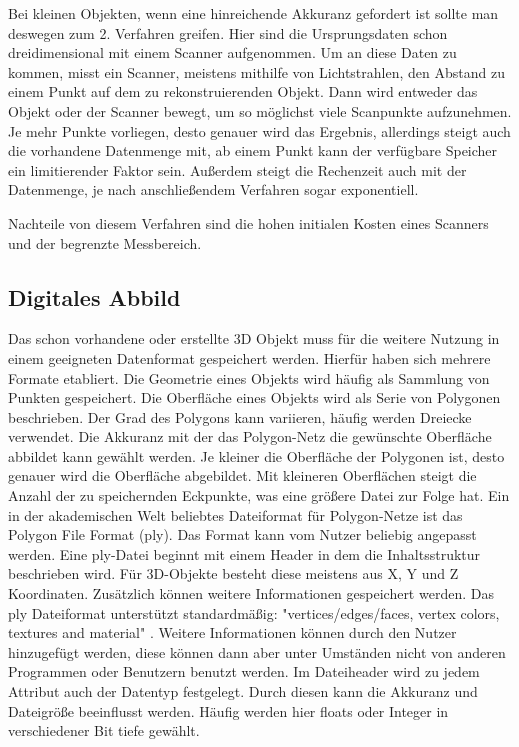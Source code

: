 \documentclass[../main.tex]{subfiles}
\begin{document}
Bei kleinen Objekten, wenn eine hinreichende Akkuranz gefordert ist sollte man 
deswegen zum 2. Verfahren greifen. Hier sind die Ursprungsdaten schon 
dreidimensional mit einem Scanner aufgenommen. Um an diese Daten zu kommen, 
misst ein Scanner, meistens mithilfe von Lichtstrahlen, den Abstand zu einem 
Punkt auf dem zu rekonstruierenden Objekt. Dann wird entweder das Objekt oder 
der Scanner bewegt, um so möglichst viele Scanpunkte aufzunehmen.
Je mehr Punkte vorliegen, desto genauer wird das Ergebnis, allerdings steigt
auch die vorhandene Datenmenge mit, ab einem Punkt kann der verfügbare 
Speicher ein limitierender Faktor sein. Außerdem steigt die Rechenzeit auch mit
der Datenmenge, je nach anschließendem Verfahren sogar exponentiell.

Nachteile von diesem Verfahren sind die hohen initialen Kosten eines Scanners 
und der begrenzte Messbereich. 

\subsection{Digitales Abbild}

Das schon vorhandene oder erstellte 3D Objekt muss für die weitere Nutzung
in einem geeigneten Datenformat gespeichert werden. Hierfür haben sich mehrere
Formate etabliert. Die Geometrie eines Objekts wird häufig als Sammlung von Punkten 
gespeichert. Die Oberfläche eines Objekts wird als Serie von Polygonen beschrieben. 
Der Grad des Polygons kann variieren, häufig werden Dreiecke verwendet. Die Akkuranz
mit der das Polygon-Netz die gewünschte Oberfläche abbildet kann gewählt werden. 
Je kleiner die Oberfläche der Polygonen ist, desto genauer wird die Oberfläche 
abgebildet. Mit kleineren Oberflächen steigt die Anzahl der zu speichernden 
Eckpunkte, was eine größere Datei zur Folge hat.
Ein in der akademischen Welt beliebtes Dateiformat für Polygon-Netze ist das 
Polygon File Format (ply).\cite{KentonMchenry.2008}
Das Format kann vom Nutzer beliebig angepasst werden. Eine ply-Datei beginnt mit 
einem Header in dem die Inhaltsstruktur beschrieben wird. 
Für 3D-Objekte besteht diese meistens aus X, Y und Z Koordinaten. 
Zusätzlich können weitere Informationen gespeichert werden. Das ply Dateiformat 
unterstützt standardmäßig: "vertices/edges/faces, vertex colors, textures and
material" \cite{KentonMchenry.2008}. Weitere Informationen können durch den Nutzer 
hinzugefügt werden, 
diese können dann aber unter Umständen nicht von anderen Programmen oder Benutzern
benutzt werden.
Im Dateiheader wird zu jedem Attribut auch der Datentyp festgelegt. Durch diesen 
kann die Akkuranz und Dateigröße beeinflusst werden. Häufig werden hier floats oder
Integer in verschiedener Bit tiefe gewählt.
\end{document}
